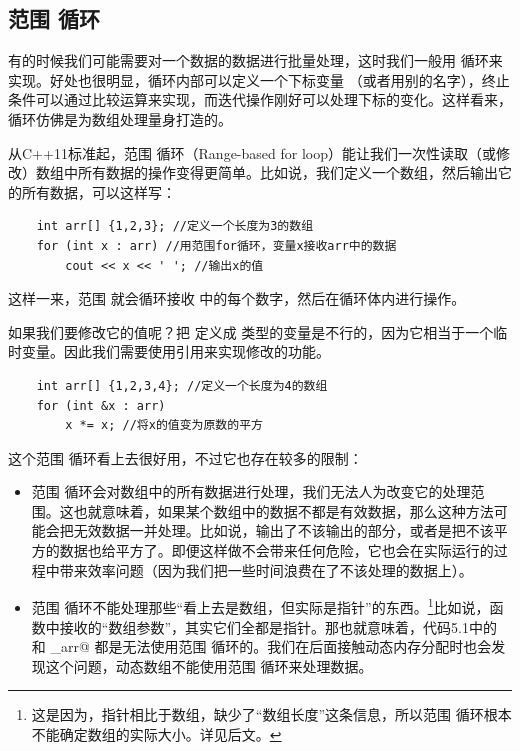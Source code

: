 \subsection*{范围 \lstinline@for@ 循环}
有的时候我们可能需要对一个数据的数据进行批量处理，这时我们一般用 \lstinline@for@ 循环来实现。好处也很明显，\lstinline@for@ 循环内部可以定义一个下标变量 \lstinline@i@（或者用别的名字），终止条件可以通过比较运算来实现，而迭代操作刚好可以处理下标的变化。这样看来，\lstinline@for@ 循环仿佛是为数组处理量身打造的。\par
从C++11标准起，范围 \lstinline@for@ 循环（Range-based for loop）能让我们一次性读取（或修改）数组中所有数据的操作变得更简单。比如说，我们定义一个数组，然后输出它的所有数据，可以这样写：
\begin{lstlisting}
    int arr[] {1,2,3}; //定义一个长度为3的数组
    for (int x : arr) //用范围for循环，变量x接收arr中的数据
        cout << x << ' '; //输出x的值
\end{lstlisting}
这样一来，范围 \lstinline@x@ 就会循环接收 \lstinline@arr@ 中的每个数字，然后在循环体内进行操作。\par
如果我们要修改它的值呢？把 \lstinline@x@ 定义成 \lstinline@int@ 类型的变量是不行的，因为它相当于一个临时变量。因此我们需要使用引用来实现修改的功能。
\begin{lstlisting}
    int arr[] {1,2,3,4}; //定义一个长度为4的数组
    for (int &x : arr)
        x *= x; //将x的值变为原数的平方
\end{lstlisting}
这个范围 \lstinline@for@ 循环看上去很好用，不过它也存在较多的限制：
\begin{itemize}
    \item 范围 \lstinline@for@ 循环会对数组中的所有数据进行处理，我们无法人为改变它的处理范围。这也就意味着，如果某个数组中的数据不都是有效数据，那么这种方法可能会把无效数据一并处理。比如说，输出了不该输出的部分，或者是把不该平方的数据也给平方了。即便这样做不会带来任何危险，它也会在实际运行的过程中带来效率问题（因为我们把一些时间浪费在了不该处理的数据上）。
    \item 范围 \lstinline@for@ 循环不能处理那些``看上去是数组，但实际是指针''的东西。\footnote{这是因为，指针相比于数组，缺少了``数组长度''这条信息，所以范围 \lstinline@for@ 循环根本不能确定数组的实际大小。详见后文。}比如说，函数中接收的``数组参数''，其实它们全都是指针。那也就意味着，代码5.1中的 \lstinline@maximum@ 和 \lstinline@input_arr@ 都是无法使用范围 \lstinline@for@ 循环的。我们在后面接触动态内存分配时也会发现这个问题，动态数组不能使用范围 \lstinline@for@ 循环来处理数据。
\end{itemize}
